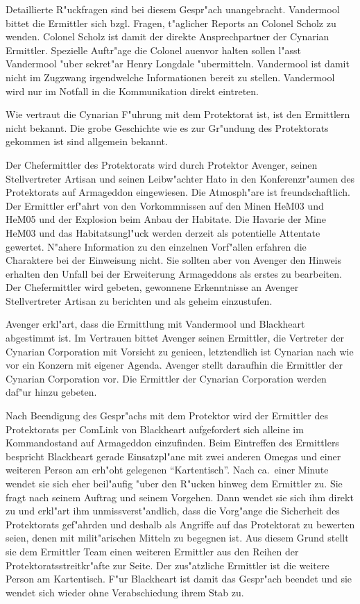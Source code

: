 \begin{remarks}	
	Detaillierte R"uckfragen sind bei diesem Gespr"ach unangebracht. Vandermool bittet die Ermittler sich bzgl. Fragen, t"aglicher Reports an Colonel Scholz zu wenden. Colonel Scholz ist damit der direkte Ansprechpartner der Cynarian Ermittler. Spezielle Auftr"age die Colonel au\3envor halten sollen l"asst Vandermool "uber sekret"ar Henry Longdale "ubermitteln. Vandermool ist damit nicht im Zugzwang irgendwelche Informationen bereit zu stellen. Vandermool wird nur im Notfall in die Kommunikation direkt eintreten.

	Wie vertraut die Cynarian F"uhrung mit dem Protektorat ist, ist den Ermittlern nicht bekannt. Die grobe Geschichte  wie es zur Gr"undung des Protektorats gekommen ist sind allgemein bekannt.

\end{remarks}



Der Chefermittler des Protektorats wird durch Protektor Avenger, seinen Stellvertreter Artisan und seinen Leibw"achter Hato in den Konferenzr"aumen des Protektorats auf Armageddon eingewiesen. Die Atmosph"are ist freundschaftlich. Der Ermittler erf"ahrt von den Vorkommnissen auf den Minen HeM03 und HeM05 und der Explosion beim Anbau der Habitate. Die Havarie der Mine HeM03 und das Habitatsungl"uck werden derzeit als potentielle Attentate gewertet. N"ahere Information zu den einzelnen Vorf"allen erfahren die Charaktere bei der Einweisung nicht. Sie sollten aber von Avenger den Hinweis erhalten den Unfall bei der Erweiterung Armageddons als erstes zu bearbeiten. Der Chefermittler wird gebeten, gewonnene Erkenntnisse an Avenger Stellvertreter Artisan zu berichten und als geheim einzustufen.

Avenger erkl"art, dass die Ermittlung mit Vandermool und Blackheart abgestimmt ist. Im Vertrauen bittet Avenger seinen Ermittler, die Vertreter der Cynarian Corporation mit Vorsicht zu genie\3en, letztendlich ist Cynarian nach wie vor ein Konzern mit eigener Agenda. Avenger stellt daraufhin die Ermittler der Cynarian Corporation vor. Die Ermittler der Cynarian Corporation werden daf"ur hinzu gebeten.

Nach Beendigung des Gespr"achs mit dem Protektor wird der Ermittler des Protektorats per ComLink von Blackheart aufgefordert sich alleine im Kommandostand auf Armageddon einzufinden. Beim Eintreffen des Ermittlers bespricht Blackheart gerade Einsatzpl"ane mit zwei anderen Omegas und einer weiteren Person am erh"oht gelegenen "`Kartentisch"'. Nach ca.~einer Minute  wendet sie sich eher beil"aufig "uber den R"ucken hinweg dem Ermittler zu. Sie fragt nach seinem Auftrag und seinem Vorgehen. Dann wendet sie sich ihm direkt zu und erkl"art ihm unmissverst"andlich, dass die Vorg"ange die Sicherheit des Protektorats gef"ahrden und deshalb als Angriffe auf das Protektorat zu bewerten seien, denen mit milit"arischen Mitteln zu begegnen ist. Aus diesem Grund stellt sie dem Ermittler Team einen weiteren Ermittler aus den Reihen der Protektoratsstreitkr"afte zur Seite. Der zus"atzliche Ermittler ist die weitere Person am Kartentisch. F"ur Blackheart ist damit das Gespr"ach beendet und sie wendet sich wieder ohne Verabschiedung ihrem Stab zu.

